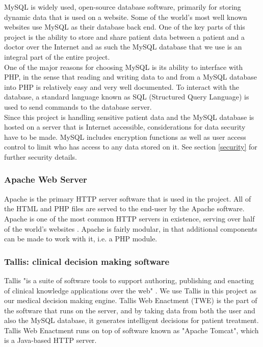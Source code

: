 \documentclass[11pt]{article}
\begin{document}
MySQL is widely used, open-source database software, primarily for storing dynamic data that is used on a website. Some of the world's most well known websites use MySQL as their database back end. One of the key parts of this project is the ability to store and share patient data between a patient and a doctor over the Internet and as such the MySQL database that we use is an integral part of the entire project. 
\\ \indent
One of the major reasons for choosing MySQL is its ability to interface with PHP, in the sense that reading and writing data to and from a MySQL database into PHP is relatively easy and very well documented. To interact with the database, a standard language known as SQL (Structured Query Language) is used to send commands to the database server.
\\ \indent
Since this project is handling sensitive patient data and the MySQL database is hosted on a server that is Internet accessible, considerations for data security have to be made. MySQL includes encryption functions as well as user access control to limit who has access to any data stored on it. See section \ref{security} for further security details.

\subsubsection{Apache Web Server}
Apache is the primary HTTP server software that is used in the project. All of the HTML and PHP files are served to the end-user by the Apache software. Apache is one of the most common HTTP servers in existence, serving over half of the world's websites \cite{netcraft:apache}. Apache is fairly modular, in that additional components can be made to work with it, i.e. a PHP module.

\subsubsection{Tallis: clinical decision making software}

Tallis "is a suite of software tools to support authoring, publishing and enacting of clinical knowledge applications over the web" \cite{tallisDescription}. We use Tallis in this project as our medical decision making engine. Tallis Web Enactment (TWE) is the part of the software that runs on the server, and by taking data from both the user and also the MySQL database, it generates intelligent decisions for patient treatment. Tallis Web Enactment runs on top of software known as "Apache Tomcat", which is a Java-based HTTP server.
\end{document}
